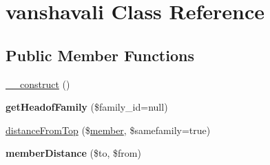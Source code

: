 \hypertarget{classvanshavali}{\section{vanshavali Class Reference}
\label{classvanshavali}
}
\subsection*{Public Member Functions}
\begin{DoxyCompactItemize}
\item 
\hyperlink{classvanshavali_aee7778d3d1ccffd71859d14a811db6ee}{\-\_\-\-\_\-construct} ()
\item 
\hypertarget{classvanshavali_a317782832806850a2862914dbceef3c7}{{\bfseries get\-Headof\-Family} (\$family\-\_\-id=null)}\label{classvanshavali_a317782832806850a2862914dbceef3c7}

\item 
\hyperlink{classvanshavali_a0b6c7f158d1ffca2d8b69181a563f041}{distance\-From\-Top} (\$\hyperlink{classmember}{member}, \$samefamily=true)
\item 
\hypertarget{classvanshavali_a1673bbda002d16cf5596737bfc7a2369}{{\bfseries member\-Distance} (\$to, \$from)}\label{classvanshavali_a1673bbda002d16cf5596737bfc7a2369}


\end{DoxyCompactItemize}

